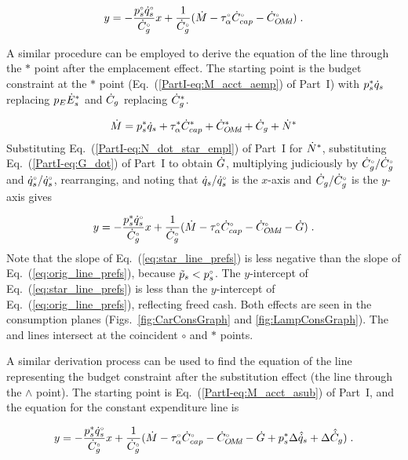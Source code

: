 \begin{equation} \label{eq:orig_line_prefs}
  y = - \frac{{}{p}^{\scriptscriptstyle \circ}_s {}{\dot{q}}^{\scriptscriptstyle \circ}_s}{{}{\dot{C}}^{\scriptscriptstyle \circ}_g} x
         + \frac{1}{{}{\dot{C}}^{\scriptscriptstyle \circ}_g} (\dot{M} - {}{\tau}^{\scriptscriptstyle \circ}_\alpha {}{\dot{C}}^{\scriptscriptstyle \circ}_{cap} - {}{\dot{C}}^{\scriptscriptstyle \circ}_{O\!M\!d}) \; .
\end{equation}

A similar procedure can be employed to derive the equation of the
\starstar{} line through the $*$ point
after the emplacement effect.
The starting point is the budget constraint at the $*$ point
(Eq.~(\ref{PartI-eq:M_acct_aemp}) of Part~I)
with 
${p}^*_s \dot{q}_s$ replacing $p_E {\dot{E}}^*_s$ and
$\dot{C}_g$ replacing ${\dot{C}}^*_g$.

\begin{equation}
  \dot{M} = {p}^*_s \dot{q}_s + {\tau}^*_\alpha {\dot{C}}^*_{cap} + {\dot{C}}^*_{O\!M\!d} + \dot{C}_g + {\dot{N}}^*
\end{equation}
%
Substituting Eq.~(\ref{PartI-eq:N_dot_star_empl}) of Part~I for ${\dot{N}}^*$,
substituting Eq.~(\ref{PartI-eq:G_dot}) of Part~I to obtain $\dot{G}$,
multiplying judiciously by ${}{\dot{C}}^{\scriptscriptstyle \circ}_g/{}{\dot{C}}^{\scriptscriptstyle \circ}_g$ and ${}{\dot{q}}^{\scriptscriptstyle \circ}_s/{}{\dot{q}}^{\scriptscriptstyle \circ}_s$, 
rearranging, and noting that 
$\dot{q}_s/{}{\dot{q}}^{\scriptscriptstyle \circ}_s$ is the $x$-axis and 
$\dot{C}_g/{}{\dot{C}}^{\scriptscriptstyle \circ}_g$ is the $y$-axis gives

\begin{equation} \label{eq:star_line_prefs}
  y = - \frac{{p}^*_s {}{\dot{q}}^{\scriptscriptstyle \circ}_s}{{}{\dot{C}}^{\scriptscriptstyle \circ}_g} x
         + \frac{1}{{}{\dot{C}}^{\scriptscriptstyle \circ}_g} (\dot{M} - {}{\tau}^{\scriptscriptstyle \circ}_\alpha {}{\dot{C}}^{\scriptscriptstyle \circ}_{cap} - {}{\dot{C}}^{\scriptscriptstyle \circ}_{O\!M\!d} - \dot{G}) \; .
\end{equation}
%
Note that the slope of Eq.~(\ref{eq:star_line_prefs}) is less negative
than the slope of Eq.~(\ref{eq:orig_line_prefs}), 
because $\tilde{p}_s < {}{p}^{\scriptscriptstyle \circ}_s$.
The $y$-intercept of Eq.~(\ref{eq:star_line_prefs}) is less than the 
$y$-intercept of Eq.~(\ref{eq:orig_line_prefs}),
reflecting freed cash.
Both effects are seen in
the consumption planes
(Figs.~\ref{fig:CarConsGraph} and \ref{fig:LampConsGraph}).
The \circcirc{} and \starstar{} lines intersect at the coincident $\circ$ and $*$ points.

A similar derivation process can be used to find the equation of 
the line representing the budget constraint
after the substitution effect (the \hathat{} line through the $\wedge$ point).
The starting point is Eq.~(\ref{PartI-eq:M_acct_asub}) of Part~I, and 
the equation for the constant expenditure line is

\begin{equation} \label{eq:hat_line_prefs}
  y = - \frac{{p}^*_s {}{\dot{q}}^{\scriptscriptstyle \circ}_s}{{}{\dot{C}}^{\scriptscriptstyle \circ}_g} x
         + \frac{1}{{}{\dot{C}}^{\scriptscriptstyle \circ}_g} (\dot{M} - {}{\tau}^{\scriptscriptstyle \circ}_\alpha {}{\dot{C}}^{\scriptscriptstyle \circ}_{cap} - {}{\dot{C}}^{\scriptscriptstyle \circ}_{O\!M\!d} 
                                   - \dot{G} + {p}^*_s \Delta \hat{\dot{q}}_s + \Delta \hat{\dot{C}}_g) \; .
\end{equation}

